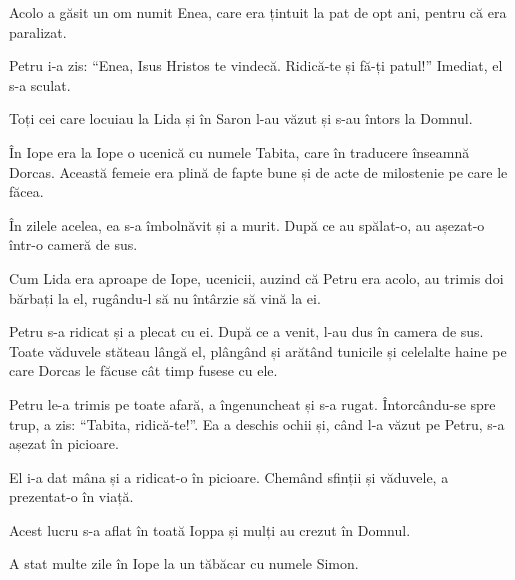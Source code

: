 {Acolo a găsit un om numit Enea, care era țintuit la pat de opt ani, pentru că era paralizat.

Petru i-a zis: “Enea, Isus Hristos te vindecă. Ridică-te și fă-ți patul!” Imediat, el s-a sculat.

Toți cei care locuiau la Lida și în Saron l-au văzut și s-au întors la Domnul.


\par }{\PP {}În Iope era la Iope o ucenică cu numele Tabita, care în traducere înseamnă Dorcas. Această femeie era plină de fapte bune și de acte de milostenie pe care le făcea.

În zilele acelea, ea s-a îmbolnăvit și a murit. După ce au spălat-o, au așezat-o într-o cameră de sus.

Cum Lida era aproape de Iope, ucenicii, auzind că Petru era acolo, au trimis doi bărbați la el, rugându-l să nu întârzie să vină la ei.

Petru s-a ridicat și a plecat cu ei. După ce a venit, l-au dus în camera de sus. Toate văduvele stăteau lângă el, plângând și arătând tunicile și celelalte haine pe care Dorcas le făcuse cât timp fusese cu ele.

Petru le-a trimis pe toate afară, a îngenuncheat și s-a rugat. Întorcându-se spre trup, a zis: “Tabita, ridică-te!”. Ea a deschis ochii și, când l-a văzut pe Petru, s-a așezat în picioare.

El i-a dat mâna și a ridicat-o în picioare. Chemând sfinții și văduvele, a prezentat-o în viață.

Acest lucru s-a aflat în toată Ioppa și mulți au crezut în Domnul.

A stat multe zile în Iope la un tăbăcar cu numele Simon.



\par }
